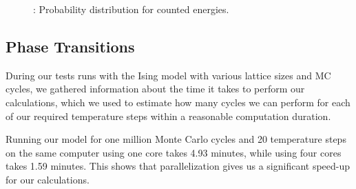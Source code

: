 \documentclass{article}
\begin{document}
{{		\begin{figure}[H]
		\caption{: Probability distribution for counted energies.}
		\label{fig:probability}
		\end{figure}

	\subsection{Phase Transitions}
		During our tests runs with the Ising model with various lattice sizes and MC cycles, we gathered information about the time it takes to perform our calculations, which we used to estimate how many cycles we can perform for each of our required temperature steps within a reasonable computation duration.

		Running our model for one million Monte Carlo cycles and 20 temperature steps on the same computer using one core takes 4.93 minutes, while using four cores takes 1.59 minutes. This shows that parallelization gives us a significant speed-up for our calculations.

}}
\end{document}
